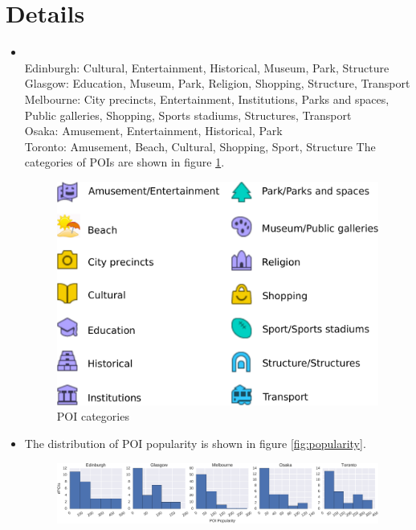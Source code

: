 \appendix
\section{Details}
\begin{itemize}
\item {} \\
      Edinburgh: Cultural, Entertainment, Historical, Museum, Park, Structure \\
      Glasgow: Education, Museum, Park, Religion, Shopping, Structure, Transport \\
      Melbourne: City precincts, Entertainment, Institutions, Parks and spaces, Public galleries, Shopping,
                 Sports stadiums, Structures, Transport \\
      Osaka: Amusement, Entertainment, Historical, Park \\
      Toronto: Amusement, Beach, Cultural, Shopping, Sport, Structure
      The categories of POIs are shown in figure \ref{fig:poicats}.
      \begin{figure}
      \includegraphics[width=\columnwidth]{fig/poi_cats.pdf}
      \caption{POI categories}
      \label{fig:poicats}
      \end{figure}
\item The distribution of POI popularity is shown in figure \ref{fig:popularity}.
      \begin{figure}
      \includegraphics[width=\textwidth]{fig/poi_popularity.pdf}

\end{figure}
\end{itemize}
